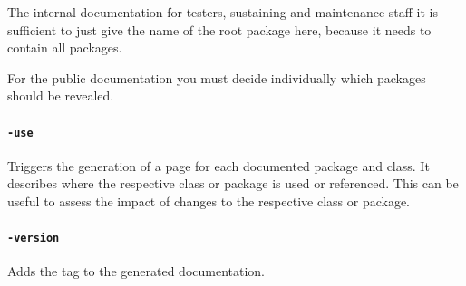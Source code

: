 The internal documentation for testers, sustaining and maintenance staff it is sufficient to just give the name of the root package here, because it needs to contain all packages.

For the public documentation you must decide individually which packages should be revealed.

\paragraph{\texttt{-use}} Triggers the generation of a  page for each documented package and class. It describes where the respective class or package is used or referenced. This can be useful to assess the impact of changes to the respective class or package.

\paragraph{\texttt{-version}} Adds the  tag to the generated documentation.



